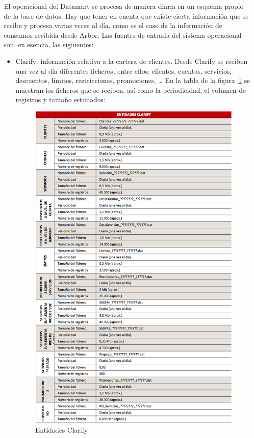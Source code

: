 \documentclass[a4paper, 12pt]{book}
\begin{document}
El operacional del Datamart se procesa de manera diaria en un esquema propio de la base de datos. Hay que tener en cuenta que existe cierta información que se recibe y procesa varias veces al día, como es el caso de la información de consumos recibida desde Arbor. Las fuentes de entrada del sistema operacional son, en esencia, las siguientes:
\begin{itemize}
	\item Clarify: información relativa a la cartera de clientes. Desde Clarify se reciben una vez al día diferentes ficheros, entre ellos: clientes, cuentas, servicios, descuentos, límites, restricciones, promociones, … En la tabla de la figura~\ref{fig:entidades1} se muestran los ficheros que se reciben, así como la periodicidad, el volumen de registros y tamaño estimados:

	\begin{figure}
	  \centering
	  \includegraphics[width=14cm, keepaspectratio]{img/entidades1}
	  \caption{Entidades Clarify}
	  \label{fig:entidades1}
	\end{figure}
	

\end{itemize}
\end{document}
